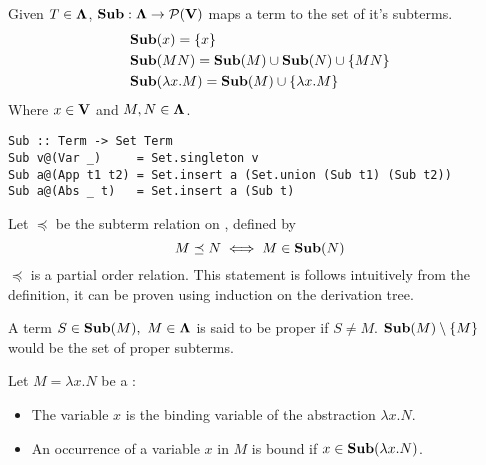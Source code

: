 \documentclass[12pt]{book}
\begin{document}
\begin{definition} Given $T \in \mathbf{\Lambda}$, $\mathbf{Sub} : \mathbf{\Lambda} \to \mathcal{P}(\mathbf{V})$ maps a term to the set of it's subterms.
  \begin{align*}
    &\mathbf{Sub}(x) = \{x\} \\
    &\mathbf{Sub}(MN) = \mathbf{Sub}(M)  \cup \mathbf{Sub}(N) \cup \{MN\} \\
    &\mathbf{Sub}(\lambda x . M) = \mathbf{Sub}(M)  \cup \{\lambda x. M\}
  \end{align*}
  Where $x \in \mathbf{V}$ and $M, N \in \mathbf{\Lambda} $.
  \begin{lstlisting}[style=haskellstyle,caption={Haskell implementation of Sub.}]
Sub :: Term -> Set Term
Sub v@(Var _)     = Set.singleton v
Sub a@(App t1 t2) = Set.insert a (Set.union (Sub t1) (Sub t2))
Sub a@(Abs _ t)   = Set.insert a (Sub t)
  \end{lstlisting}
\end{definition}
\begin{remark}
  Let \( \preceq \) be the subterm relation on \lterms, defined by
  \[
    M \preceq N \iff M \in \mathbf{Sub}( N )
  \]
  \( \preceq \) is a partial order relation. This statement is follows intuitively from the definition, it can be proven using induction on the derivation tree.
\end{remark}
\begin{definition} A term $ S \in \mathbf{Sub}(M), \ M \in \mathbf{\Lambda}$ is said to be proper if $S \neq M$. $\mathbf{Sub}(M) \setminus \{M\}$ would be the set of proper subterms.
\end{definition}
\begin{definition} Let \( M = \lambda x. N \) be a \lterm:
  \begin{itemize}
  \item The variable \( x \) is the binding variable of the abstraction \( \lambda x. N \).
  \item An occurrence of a variable \( x \) in \( M \) is bound if \( x \in \mathbf{Sub}( \lambda x. N ) \).
  \end{itemize}
\end{definition}


\end{document}
